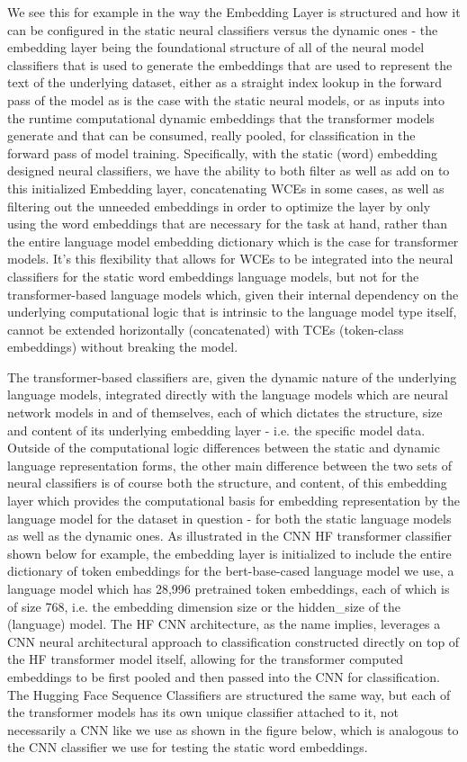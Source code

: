 \documentclass[final]{clv2025-revised}
\begin{document}
We see this for example in the way the Embedding Layer is structured and how it can be configured in the static neural classifiers versus the dynamic ones - the embedding layer being the foundational structure of all of the neural model classifiers that is used to generate the embeddings that are used to represent the text of the underlying dataset, either as a straight index lookup in the forward pass of the model as is the case with the static neural models, or as inputs into the runtime computational dynamic embeddings that the transformer models generate and that can be consumed, really pooled, for classification in the forward pass of model training. Specifically, with the static (word) embedding designed neural classifiers, we have the ability to both filter as well as add on to this initialized Embedding layer, concatenating WCEs in some cases, as well as filtering out the unneeded embeddings in order to optimize the layer by only using the word embeddings that are necessary for the task at hand, rather than the entire language model embedding dictionary which is the case for transformer models. It's this flexibility that allows for WCEs to be integrated into the neural classifiers for the static word embeddings language models, but not for the transformer-based language models which, given their internal dependency on the underlying computational logic that is intrinsic to the language model type itself, cannot be extended horizontally (concatenated) with TCEs (token-class embeddings) without breaking the model.

The transformer-based classifiers are, given the dynamic nature of the underlying language models, integrated directly with the language models which are neural network models in and of themselves, each of which dictates the structure, size and content of its underlying embedding layer - i.e. the specific model data. Outside of the computational logic differences between the static and dynamic language representation forms, the other main difference between the two sets of neural classifiers is of course both the structure, and content, of this embedding layer which provides the computational basis for embedding representation by the language model for the dataset in question - for both the static language models as well as the dynamic ones. As illustrated in the CNN HF transformer classifier shown below for example, the embedding layer is initialized to include the entire dictionary of token embeddings for the bert-base-cased language model we use, a language model which has 28,996 pretrained token embeddings, each of which is of size 768, i.e. the embedding dimension size or the hidden\_size of the (language) model. The HF CNN architecture, as the name implies, leverages a CNN neural architectural approach to classification constructed directly on top of the HF transformer model itself, allowing for the transformer computed embeddings to be first pooled and then passed into the CNN for classification. The Hugging Face Sequence Classifiers are structured the same way, but each of the transformer models has its own unique classifier attached to it, not necessarily a CNN like we use as shown in the figure below, which is analogous to the CNN classifier we use for testing the static word embeddings. 
\end{document}
